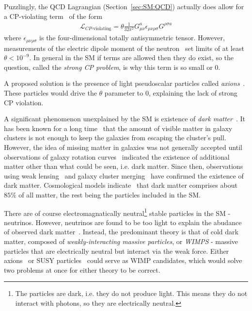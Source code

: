 Puzzlingly, the QCD Lagrangian (Section~\ref{sec:SM:QCD}) actually does allow for a CP-violating term~\cite{Dine:2000cj} of the form
\begin{align}
\mathcal{L}_\text{$CP$-violating} = \theta \frac{1}{32\pi^2}G_{\mu\nu}^a\epsilon_{\mu\nu\rho\sigma}G^{\rho\sigma a}
\end{align}
where $\epsilon_{\mu\nu\rho\sigma}$ is the four-dimensional totally antisymmetric tensor.
However, measurements of the electric dipole moment of the neutron~\cite{Baker:2006ts} set limits of at least $\theta < 10^{-9}$.
In general in the SM if terms are allowed then they do exist, so the question, called the \textit{strong CP problem}, is why this term is so small or $0$.

A proposed solution is the presence of light pseudoscalar particles called \textit{axions}~\cite{Peccei:1977hh,Baluni:1978rf,Crewther:1979pi,Peccei:1977ur,Weinberg:1977ma,Wilczek:1977pj}.
These particles would drive the $\theta$ parameter to $0$, explaining the lack of strong CP violation.

A significant phenomenon unexplained by the SM is existence of \textit{dark matter}~\cite{Bertone:2010zza,darkmatter}.
It has been known for a long time~\cite{Zwicky:1937} that the amount of visible matter in galaxy clusters is not enough to keep the galaxies from escaping the cluster's pull.
However, the idea of missing matter in galaxies was not generally accepted until observations of galaxy rotation curves~\cite{rubin:1970,freeman:1970,vanAlbada:1984js} indicated the existence of additional matter other than what could be seen, i.e. dark matter.
Since then, observations using weak lensing~\cite{Clowe:2003tk} and galaxy cluster merging~\cite{Markevitch:2003at} have confirmed the existence of dark matter.
Cosmological models indicate~\cite{Aghanim:2018eyx} that dark matter comprises about $85\%$ of all matter, the rest being the particles included in the SM.

There are of course electromagnatically neutral\footnote{The particles are dark, i.e. they do not produce light. This means they do not interact with photons, so they are electrically neutral.}  stable particles in the SM - neutrinos. However, neutrinos are found to be too light to explain the abudance of observed dark matter~\cite{White:1984yj}.
Instead, the predominant theory is that of cold dark matter, composed of \textit{weakly-interacting massive particles}, or \textit{WIMPS} - massive particles that are electrically neutral but interact via the weak force.
Either axions~\cite{Raffelt:1995ym} or SUSY particles~\cite{Jungman:1995df} could serve as WIMP candidates, which would solve two problems at once for either theory to be correct. 

